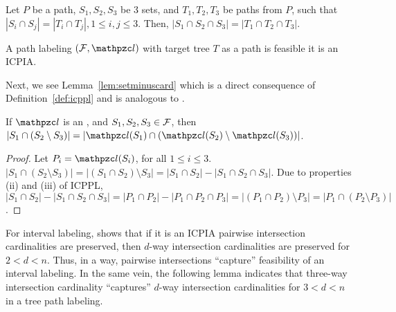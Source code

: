 \begin{lemma}
  \label{lem:intersection-cardinality} 
  Let $P$ be a path, $S_1, S_2, S_3$ be 3 sets, and $T_1, T_2, T_3$ be
  paths from $P$, such that $|S_i \cap S_j |=|T_i \cap T_j|, 1 \leq
  i,j \leq 3$.  Then, $|S_1 \cap S_2 \cap S_3| = |T_1 \cap T_2 \cap
  T_3|$.
\end{lemma}
\begin{lemma}
  \label{lem:icpia} 
  A path labeling $(\cF, \cl)$ with target tree $T$ as a path is
  feasible \iff it is an ICPIA.
\end{lemma}

Next, we see Lemma~\ref{lem:setminuscard} which is a direct
consequence of Definition~\ref{def:icppl} and is analogous to
\cite[Cor.~1]{nsnrs09}.

\begin{lemma}
  \label{lem:setminuscard}
  If $\cl$ is an \ICPPL, and $S_1, S_2, S_3 \in {\cal F}$, then $|S_1 \cap
  (S_2 \setminus S_3)| = |\cl(S_1) \cap (\cl(S_2) \setminus
  \cl(S_3))|$.
\end{lemma}
\begin{proof}\thesisspacing%
  Let $P_i = \cl(S_i)$, for all $1 \le i \le 3$.  $|S_1 \cap (S_2
  \setminus S_3)| = |(S_1 \cap S_2) \setminus S_3| = |S_1 \cap S_2| -
  |S_1 \cap S_2 \cap S_3|$. Due to properties (ii) and (iii) of ICPPL,
  $|S_1 \cap S_2| - |S_1 \cap S_2 \cap S_3| = |P_1 \cap P_2| - |P_1
  \cap P_2 \cap P_3| = |(P_1 \cap P_2) \setminus P_3| = |P_1 \cap (P_2
  \setminus P_3)|$. %
\end{proof}

For interval labeling, \cite{nsnrs09} shows that if it is an ICPIA \ie
pairwise intersection cardinalities are preserved, then $d$-way
intersection cardinalities are preserved for $2 < d < n$. Thus, in a
way, pairwise intersections ``capture'' feasibility of an interval
labeling. In the same vein, the following lemma indicates that
three-way intersection cardinality ``captures'' $d$-way intersection
cardinalities for $3 < d < n$ in a tree path labeling.

